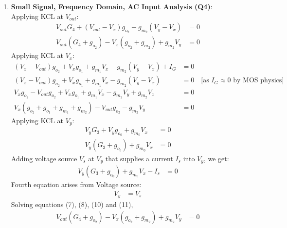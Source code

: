 \begin{enumerate}
    \(k_n = \frac{K_P}{2}\frac{W}{L}\),
    \begin{align*}
      \frac{I_{OUT}}{I_{IN}} \approx \frac{I_{M_2}}{I_{M_0}} \approx \frac{I_{M_1}}{I_{M_0}} \approx \frac{k_{n_1}}{k_{n_0}} = \frac{\frac{K_P}{2} \frac{W_1}{L_1}}{\frac{K_P}{2} \frac{W_0}{L_0}} = \frac{\frac{W_1}{L_1}}{\frac{W_0}{L_0}} = \frac{W_1 L_0}{L_1 W_0}
    \end{align*}
  \item \textbf{Small Signal, Frequency Domain, AC Input Analysis (Q4)}:\\
    Applying KCL at $V_{out}$:
    \begin{align*}
      V_{out}G_4 + (V_{out} - V_{x})g_{o_2} + g_{m_2}(V_{y} - V_{x}) &= 0 \\
      V_{out}(G_4 + g_{o_2}) - V_{x}(g_{o_2} + g_{m_2}) + g_{m_2}V_{y} &= 0 \tag{7}
    \end{align*}
    Applying KCL at $V_{x}$:
    \begin{align*}
      (V_{x} - V_{out})g_{o_2} + V_{x}g_{o_1} + g_{m_1}V_{x} - g_{m_2}(V_{y} - V_{x}) + I_{G} &= 0 \\
      (V_{x} - V_{out})g_{o_2} + V_{x}g_{o_1} + g_{m_1}V_{x} - g_{m_2}(V_{y} - V_{x}) &= 0 \quad \text{[as } I_{G} \approx 0 \text{ by MOS physics]} \\
      V_{x}g_{o_2} - V_{out}g_{o_2} + V_{x}g_{o_1} + g_{m_1}V_{x} - g_{m_2}V_{y} + g_{m_2}V_{x} &= 0 \\
      V_{x}(g_{o_2} + g_{o_1} + g_{m_1} + g_{m_2}) - V_{out}g_{o_2} - g_{m_2}V_{y} &= 0 \tag{8}
    \end{align*}
    Applying KCL at $V_{y}$:
    \begin{align*}
      V_{y}G_3 + V_{y}g_{o_0} + g_{m_0}V_{x} &= 0 \\
      V_{y}(G_3 + g_{o_0}) + g_{m_0}V_{x} &= 0 \tag{9}
    \end{align*}
    Adding voltage source $V_s$ at $V_y$ that supplies
    a current $I_s$ into $V_y$, we get:
    \begin{align*}
      V_{y}(G_3 + g_{o_0}) + g_{m_0}V_{x} - I_{s} &= 0 \tag{10}
    \end{align*}
    Fourth equation arises from Voltage source:
    \begin{align*}
      V_{y} &= V_{s} \tag{11}
    \end{align*}
    Solving equations (7), (8), (10) and (11),
    \begin{align*}
      V_{out}(G_4 + g_{o_2}) - V_{x}(g_{o_2} + g_{m_2}) + g_{m_2}V_{y} &= 0 \\

\end{align*}
\end{enumerate}
